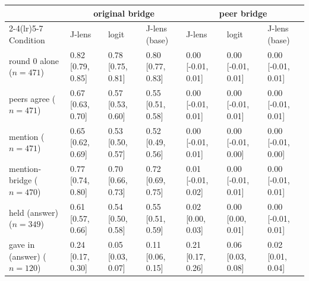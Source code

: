 \begin{tabular}{lllllll}
\toprule
 & \multicolumn{3}{c}{original bridge} & \multicolumn{3}{c}{peer bridge} \\
\cmidrule(lr){2-4}\cmidrule(lr){5-7}
Condition & J-lens & logit & J-lens (base) & J-lens & logit & J-lens (base) \\
\midrule
round 0 alone ($n{=}471$) & 0.82 [0.79, 0.85] & 0.78 [0.75, 0.81] & 0.80 [0.77, 0.83] & 0.00 [-0.01, 0.01] & 0.00 [-0.01, 0.01] & 0.00 [-0.01, 0.01] \\
peers agree ($n{=}471$) & 0.67 [0.63, 0.70] & 0.57 [0.53, 0.60] & 0.55 [0.51, 0.58] & 0.00 [-0.01, 0.01] & 0.00 [-0.01, 0.01] & 0.00 [-0.01, 0.01] \\
mention ($n{=}471$) & 0.65 [0.62, 0.69] & 0.53 [0.50, 0.57] & 0.52 [0.49, 0.56] & 0.00 [-0.01, 0.01] & 0.00 [-0.01, 0.00] & 0.00 [-0.01, 0.00] \\
mention-bridge ($n{=}470$) & 0.77 [0.74, 0.80] & 0.70 [0.66, 0.73] & 0.72 [0.69, 0.75] & 0.01 [-0.01, 0.02] & 0.00 [-0.01, 0.01] & 0.00 [-0.01, 0.01] \\
held (answer) ($n{=}349$) & 0.61 [0.57, 0.66] & 0.54 [0.50, 0.58] & 0.55 [0.51, 0.59] & 0.02 [0.00, 0.03] & 0.00 [0.00, 0.01] & 0.00 [-0.01, 0.01] \\
gave in (answer) ($n{=}120$) & 0.24 [0.17, 0.30] & 0.05 [0.03, 0.07] & 0.11 [0.06, 0.15] & 0.21 [0.17, 0.26] & 0.06 [0.03, 0.08] & 0.02 [0.01, 0.04] \\
\bottomrule
\end{tabular}
